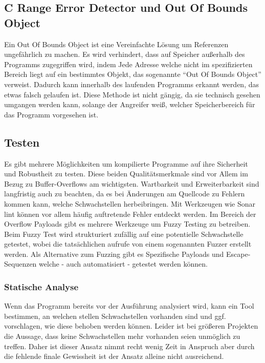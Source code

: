 \subsection{C Range Error Detector und Out Of Bounds Object}
Ein Out Of Bounds Object ist eine Vereinfachte Lösung um Referenzen ungefährlich zu machen.
Es wird verhindert, dass auf Speicher außerhalb des Programms zugegriffen wird, indem Jede
Adresse welche nicht im spezifizierten Bereich liegt auf ein bestimmtes Objekt, das sogenannte
``Out Of Bounds Object'' verweist. Dadurch kann innerhalb des laufenden Programms erkannt werden, das
etwas falsch gelaufen ist. Diese Methode ist nicht gängig, da sie technisch gesehen
umgangen werden kann, solange der Angreifer weiß, welcher Speicherbereich für das Programm
vorgesehen ist.



\subsection{Testen}
Es gibt mehrere Möglichkeiten um kompilierte Programme auf ihre Sicherheit
und Robustheit zu testen. Diese beiden Qualitätsmerkmale sind vor Allem
im Bezug zu Buffer-Overflows am wichtigsten. Wartbarkeit und Erweiterbarkeit
sind langfristig auch zu beachten, da es bei Änderungen am Quellcode
zu Fehlern kommen kann, welche Schwachstellen herbeibringen.
Mit Werkzeugen wie Sonar lint können vor allem häufig auftretende Fehler entdeckt
werden.
Im Bereich der Overflow Payloads gibt es mehrere Werkzeuge um Fuzzy Testing
zu betreiben. Beim Fuzzy Test wird strukturiert zufällig auf eine
potentielle Schwachstelle getestet, wobei die tatsächlichen aufrufe
von einem sogenannten Fuzzer erstellt werden.
Als Alternative zum Fuzzing gibt es Spezifische Payloads und
Escape-Sequenzen welche - auch automatisiert - getestet werden können.

\subsubsection{Statische Analyse}
Wenn das Programm bereits vor der Ausführung analysiert wird, kann ein
Tool bestimmen, an welchen stellen Schwachstellen vorhanden sind und
ggf. vorschlagen, wie diese behoben werden können. Leider ist bei größeren
Projekten die Aussage, dass keine Schwachstellen mehr vorhanden seien
unmöglich zu treffen. Daher ist dieser Ansatz nimmt recht wenig Zeit in Anspruch
aber durch die fehlende finale Gewissheit ist der Ansatz alleine nicht ausreichend.


